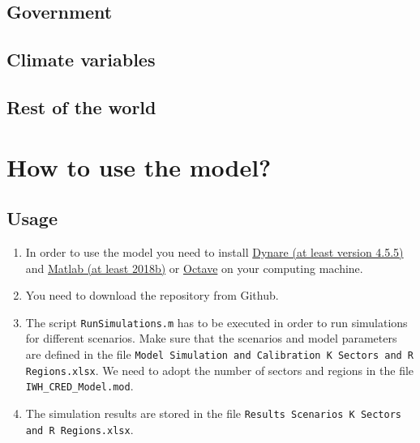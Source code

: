 \documentclass[10pt,a4paper]{article}
\begin{document}
\subsection{Government}


\subsection{Climate variables}


\subsection{Rest of the world}


\cleardoublepage
\section{How to use the model?}\label{sec:modelusage}
\subsection{Usage}
\begin{enumerate}
\item In order to use the model you need to install \href{https://www.dynare.org/}{Dynare (at least version 4.5.5)}  and \href{https://www.mathworks.com/products/matlab.html}{Matlab (at least 2018b)} or \href{https://www.gnu.org/software/octave/}{Octave} on your computing machine. 
\item You need to download the repository from Github. 
\item The script {\tt RunSimulations.m} has to be executed in order to run simulations for different scenarios. Make sure that the scenarios and model parameters are defined in the file {\tt Model Simulation and Calibration K Sectors and R Regions.xlsx}. We need to adopt the number of sectors and regions in the file {\tt IWH\_CRED\_Model.mod}.
\item The simulation results are stored in the file {\tt Results Scenarios K Sectors and R Regions.xlsx}.
\end{enumerate}
\end{document}
